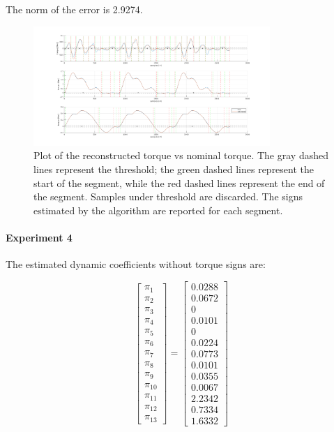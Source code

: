 \documentclass{article}
\begin{document}
The norm of the error is 2.9274.

\begin{figure}[!htbp]
\centering
\includegraphics[width=0.8\textwidth]{images/3-dof/results_experiment3.png}
\caption{Plot of the reconstructed torque vs nominal torque. The gray dashed lines represent the threshold; the green dashed lines represent the start of the segment, while the red dashed lines represent the end of the segment. Samples under threshold are discarded. The signs estimated by the algorithm are reported for each segment.}
\end{figure}
\FloatBarrier

\pagebreak

\paragraph{Experiment 4} The estimated dynamic coefficients without torque signs are:

\[\begin{bmatrix}
\pi_1 \\ \pi_2 \\ \pi_3 \\ \pi_4 \\ \pi_5 \\ \pi_6 \\ \pi_7 \\ \pi_8 \\  \pi_9 \\ \pi_{10} \\ \pi_{11} \\ \pi_{12} \\ \pi_{13}
\end{bmatrix}=\begin{bmatrix}
0.0288 \\ 0.0672 \\ 0 \\ 0.0101 \\ 0 \\ 0.0224 \\ 0.0773 \\ 0.0101 \\ 0.0355 \\ 0.0067 \\ 2.2342 \\ 0.7334 \\ 1.6332
\end{bmatrix}\]
\end{document}
